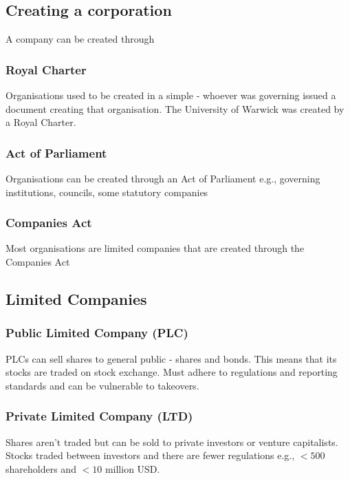 \documentclass[a4paper]{article}
\theoremstyle{plain}
\theoremstyle{definition}
\theoremstyle{remark}
\begin{document}
\subsection{Creating a corporation}
A company can be created through
\subsubsection{Royal Charter}
Organisations used to be created in a simple - whoever was governing issued a document creating that organisation. The University of Warwick was created by a Royal Charter.
\subsubsection{Act of Parliament}
Organisations can be created through an Act of Parliament e.g., governing institutions, councils, some statutory companies
\subsubsection{Companies Act}
Most organisations are limited companies that are created through the Companies Act
\subsection{Limited Companies}
\subsubsection{Public Limited Company (PLC)}
PLCs can sell shares to general public - shares and bonds. This means that its stocks are traded on stock exchange. Must adhere to regulations and reporting standards and can be vulnerable to takeovers.
\subsubsection{Private Limited Company (LTD)}
Shares aren't traded but can be sold to private investors or venture capitalists. Stocks traded between investors and there are fewer regulations e.g., $<500$ shareholders and $<10$ million USD.
\end{document}
